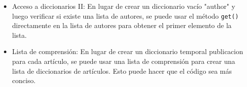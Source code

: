 \begin{itemize}
    \item Acceso a diccionarios II:
    En lugar de crear un diccionario vacío "author" y luego verificar si existe una lista de autores, se puede usar el método \verb|get()| directamente en la lista de autores para obtener el primer elemento de la lista.

    \item Lista de comprensión:
    En lugar de crear un diccionario temporal publicacion para cada artículo, se puede usar una lista de comprensión para crear una lista de diccionarios de artículos. Esto puede hacer que el código sea más conciso.
	
    
\end{itemize}
